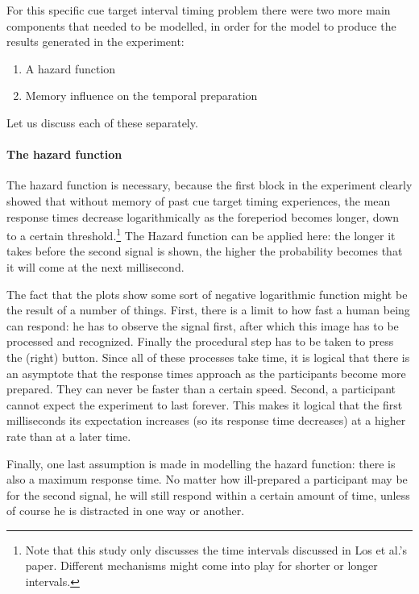 \documentclass[10pt,letterpaper]{article}
\begin{document}
For this specific cue target interval timing problem there were two more main components that needed to be modelled, in order for the model to produce the results generated in the experiment:
\begin{enumerate}
	\item A hazard function
	\item Memory influence on the temporal preparation
\end{enumerate}
Let us discuss each of these separately.

\paragraph{The hazard function}
The hazard function is necessary, because the first block in the experiment clearly showed that without memory of past cue target timing experiences, the mean response times decrease logarithmically as the foreperiod becomes longer, down to a certain threshold.\footnote{Note that this study only discusses the time intervals discussed in Los et al.'s paper. Different mechanisms might come into play for shorter or longer intervals.} The Hazard function can be applied here: the longer it takes before the second signal is shown, the higher the probability becomes that it will come at the next millisecond. 

The fact that the plots show some sort of negative logarithmic function might be the result of a number of things. First, there is a limit to how fast a human being can respond: he has to observe the signal first, after which this image has to be processed and recognized. Finally the procedural step has to be taken to press the (right) button. Since all of these processes take time, it is logical that there is an asymptote that the response times approach as the participants become more prepared. They can never be faster than a certain speed. Second, a participant cannot expect the experiment to last forever. This makes it logical that the first milliseconds its expectation increases (so its response time decreases) at a higher rate than at a later time. 

Finally, one last assumption is made in modelling the hazard function: there is also a maximum response time. No matter how ill-prepared a participant may be for the second signal, he will still respond within a certain amount of time, unless of course he is distracted in one way or another.
\end{document}
